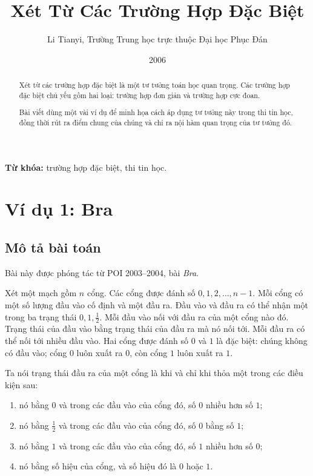 \documentclass[11pt]{article}
\title{Xét Từ Các Trường Hợp Đặc Biệt}
\author{Li Tianyi, Trường Trung học trực thuộc Đại học Phục Đán}
\date{2006}
\begin{document}
\maketitle


\renewcommand{\abstractname}{Tóm tắt}
\begin{abstract}
Xét từ các trường hợp đặc biệt là một tư tưởng toán học quan trọng. Các trường
hợp đặc biệt chủ yếu gồm hai loại: trường hợp đơn giản và trường hợp cực đoan.

Bài viết dùng một vài ví dụ để minh họa cách áp dụng tư tưởng này trong thi
tin học, đồng thời rút ra điểm chung của chúng và chỉ ra nội hàm quan trọng
của tư tưởng đó.
\end{abstract}

\noindent\textbf{Từ khóa:} trường hợp đặc biệt, thi tin học.

\tableofcontents

\section{Ví dụ 1: Bra}

\subsection{Mô tả bài toán}

Bài này được phóng tác từ POI 2003--2004, bài \textit{Bra}.

Xét một mạch gồm \(n\) cổng. Các cổng được đánh số
\(0,1,2,\ldots,n-1\). Mỗi cổng có một số lượng đầu vào cố định và một đầu ra.
Đầu vào và đầu ra có thể nhận một trong ba trạng thái \(0,1,\frac12\). Mỗi đầu
vào nối với đầu ra của một cổng nào đó. Trạng thái của đầu vào bằng trạng thái
của đầu ra mà nó nối tới. Mỗi đầu ra có thể nối tới nhiều đầu vào. Hai cổng
được đánh số \(0\) và \(1\) là đặc biệt: chúng không có đầu vào; cổng \(0\)
luôn xuất ra \(0\), còn cổng \(1\) luôn xuất ra \(1\).

Ta nói trạng thái đầu ra của một cổng là  khi và chỉ khi thỏa một
trong các điều kiện sau:
\begin{enumerate}
  \item nó bằng \(0\) và trong các đầu vào của cổng đó, số \(0\) nhiều hơn số
  \(1\);
  \item nó bằng \(\frac12\) và trong các đầu vào của cổng đó, số \(0\) bằng số
  \(1\);
  \item nó bằng \(1\) và trong các đầu vào của cổng đó, số \(1\) nhiều hơn số
  \(0\);
  \item nó bằng số hiệu của cổng, và số hiệu đó là \(0\) hoặc \(1\).
\end{enumerate}
\end{document}
